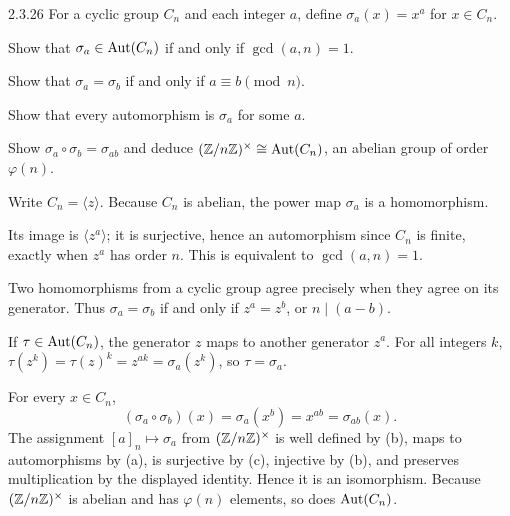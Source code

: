 \documentclass[11pt,oneside]{article}
\begin{document}
\begin{exercise}{2.3.26}
For a cyclic group $C_n$ and each integer $a$, define $\sigma_a(x)=x^a$ for $x\in C_n$.
\begin{exercisesubparts}
\item Show that $\sigma_a\in\operatorname{Aut}(C_n)$ if and only if $\gcd(a,n)=1$.
\item Show that $\sigma_a=\sigma_b$ if and only if $a\equiv b\pmod n$.
\item Show that every automorphism is $\sigma_a$ for some $a$.
\item Show $\sigma_a\circ\sigma_b=\sigma_{ab}$ and deduce $(\mathbb{Z}/n\mathbb{Z})^\times\cong\operatorname{Aut}(C_n)$, an abelian group of order $\varphi(n)$.
\end{exercisesubparts}
\end{exercise}

\begin{solution}
Write $C_n=\langle z\rangle$. Because $C_n$ is abelian, the power map $\sigma_a$ is a homomorphism.
\begin{exercisesubparts}
\item Its image is $\langle z^a\rangle$; it is surjective, hence an automorphism since $C_n$ is finite, exactly when $z^a$ has order $n$. This is equivalent to $\gcd(a,n)=1$.
\item Two homomorphisms from a cyclic group agree precisely when they agree on its generator. Thus $\sigma_a=\sigma_b$ if and only if $z^a=z^b$, or $n\mid(a-b)$.
\item If $\tau\in\operatorname{Aut}(C_n)$, the generator $z$ maps to another generator $z^a$. For all integers $k$, $\tau(z^k)=\tau(z)^k=z^{ak}=\sigma_a(z^k)$, so $\tau=\sigma_a$.
\item For every $x\in C_n$,
\[
 (\sigma_a\circ\sigma_b)(x)=\sigma_a(x^b)=x^{ab}=\sigma_{ab}(x).
\]
The assignment $[a]_n\mapsto\sigma_a$ from $(\mathbb{Z}/n\mathbb{Z})^\times$ is well defined by (b), maps to automorphisms by (a), is surjective by (c), injective by (b), and preserves multiplication by the displayed identity. Hence it is an isomorphism. Because $(\mathbb{Z}/n\mathbb{Z})^\times$ is abelian and has $\varphi(n)$ elements, so does $\operatorname{Aut}(C_n)$.
\end{exercisesubparts}
\end{solution}
\end{document}
